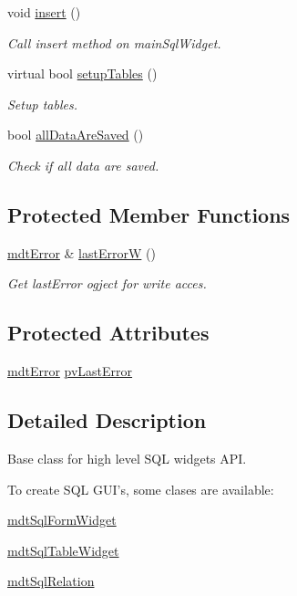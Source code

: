\begin{DoxyCompactItemize}
void \hyperlink{classmdt_sql_form_a2138e4e1236a9b1c002825ddd9e59298}{insert} ()
\begin{DoxyCompactList}\small\item\em Call insert method on main\-Sql\-Widget. \end{DoxyCompactList}\item 
virtual bool \hyperlink{classmdt_sql_form_a27fe6e45aa5d4d7782aad9833e6de20b}{setup\-Tables} ()
\begin{DoxyCompactList}\small\item\em Setup tables. \end{DoxyCompactList}\item 
bool \hyperlink{classmdt_sql_form_a1e14cbb5bf04d2eb1c703862a6084031}{all\-Data\-Are\-Saved} ()
\begin{DoxyCompactList}\small\item\em Check if all data are saved. \end{DoxyCompactList}\end{DoxyCompactItemize}
\subsection*{Protected Member Functions}
\begin{DoxyCompactItemize}
\item 
\hyperlink{classmdt_error}{mdt\-Error} \& \hyperlink{classmdt_sql_form_abee43c43913605ad585ad163b998fca4}{last\-Error\-W} ()
\begin{DoxyCompactList}\small\item\em Get last\-Error ogject for write acces. \end{DoxyCompactList}\end{DoxyCompactItemize}
\subsection*{Protected Attributes}
\begin{DoxyCompactItemize}
\item 
\hyperlink{classmdt_error}{mdt\-Error} \hyperlink{classmdt_sql_form_afc24e8dedd1249a29708347fdff560fd}{pv\-Last\-Error}
\end{DoxyCompactItemize}


\subsection{Detailed Description}
Base class for high level S\-Q\-L widgets A\-P\-I. 

To create S\-Q\-L G\-U\-I's, some clases are available\-:
\begin{DoxyItemize}
\item \hyperlink{classmdt_sql_form_widget}{mdt\-Sql\-Form\-Widget}
\item \hyperlink{classmdt_sql_table_widget}{mdt\-Sql\-Table\-Widget}
\item \hyperlink{classmdt_sql_relation}{mdt\-Sql\-Relation}
\end{DoxyItemize}


